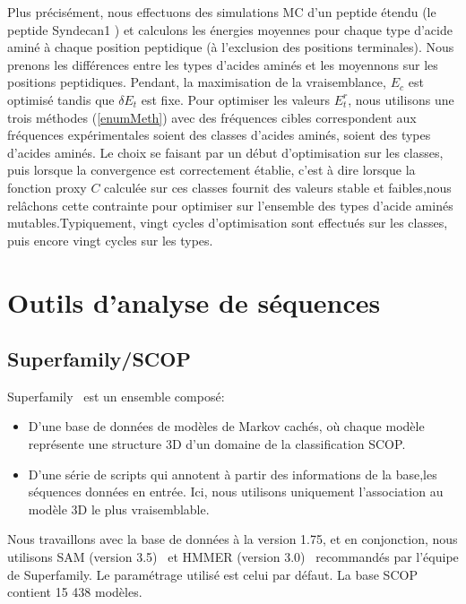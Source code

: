Plus précisément, nous effectuons des simulations MC d'un peptide étendu (le peptide Syndecan1 ) et calculons les énergies moyennes pour chaque type d'acide aminé à chaque position peptidique (à l'exclusion des positions terminales). Nous prenons les différences entre les types d'acides aminés et les moyennons sur les positions peptidiques.
Pendant, la maximisation de la vraisemblance, $E_c$ est optimisé tandis que $\delta E_t$ est fixe. Pour optimiser les valeurs $E^r_t$, nous utilisons une trois méthodes (\ref{enumMeth}) avec des fréquences cibles correspondent aux fréquences expérimentales soient des classes d'acides aminés, soient des types d'acides aminés. Le choix se faisant par un début d'optimisation sur les classes, puis lorsque la convergence est correctement établie, c'est à dire  lorsque la fonction proxy $C$ calculée sur ces classes fournit des valeurs stable et faibles,nous relâchons cette contrainte pour optimiser sur l'ensemble des types d'acide aminés mutables.Typiquement, vingt cycles d'optimisation sont effectués sur les classes, puis encore vingt cycles sur les types.  



\section{Outils d'analyse de séquences} 
\subsection{Superfamily/SCOP}
\label{subsection:Superfamily}

Superfamily~\citep{refSuperfamily} est un ensemble composé: 

\begin{itemize}
\item D'une base de données de modèles de Markov cachés, où chaque modèle représente une structure 3D d'un domaine de la classification SCOP.
\item D'une série de scripts qui annotent à partir des informations de la base,les séquences données en entrée. Ici, nous utilisons uniquement l'association au modèle 3D le plus vraisemblable. 
\end{itemize}

Nous travaillons avec la base de données à la version 1.75, et en conjonction, nous utilisons SAM (version 3.5)~\citep{refSam} et HMMER (version 3.0)~\citep{refHmmer} recommandés par l'équipe de Superfamily. Le paramétrage utilisé est celui par défaut. La base SCOP contient 15 438 modèles.

